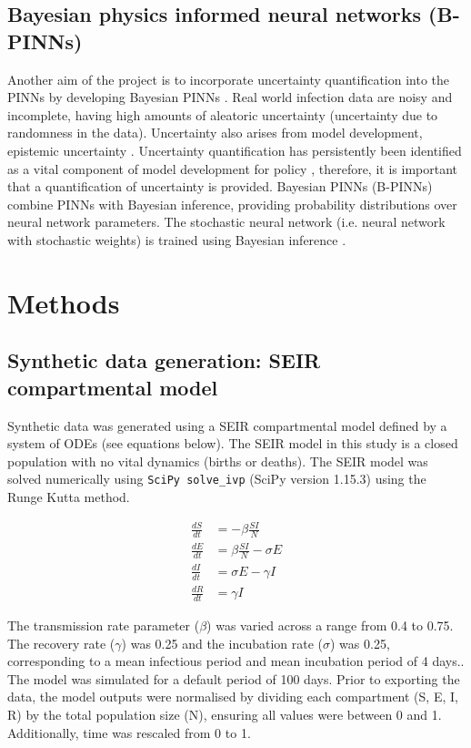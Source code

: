 \documentclass{article}
\begin{document}
\subsection{Bayesian physics informed neural networks (B-PINNs)}
Another aim of the project is to incorporate uncertainty quantification into the PINNs by developing Bayesian PINNs \parencite{https://doi.org/10.48550/arxiv.2205.08304, https://doi.org/10.48550/arxiv.2003.06097}. Real world infection data are noisy and incomplete, having high amounts of aleatoric uncertainty (uncertainty due to randomness in the data). Uncertainty also arises from model development, epistemic uncertainty \parencite{https://doi.org/10.48550/arxiv.1910.09457}. Uncertainty quantification has persistently been identified as a vital component of model development for policy \parencite{McCabe2021, Zelner2021, Juul2020}, therefore, it is important that a quantification of uncertainty is provided. Bayesian PINNs (B-PINNs) combine PINNs with Bayesian inference, providing probability distributions over neural network parameters. The stochastic neural network (i.e. neural network with stochastic weights) is trained using Bayesian inference \parencite{https://doi.org/10.48550/arxiv.2007.06823}.

\section{Methods}
\subsection{Synthetic data generation: SEIR compartmental model}
Synthetic data was generated using a SEIR compartmental model defined by a system of ODEs (see equations below). The SEIR model in this study is a closed population with no vital dynamics (births or deaths). The SEIR model was solved numerically using \texttt{SciPy solve\_ivp} (SciPy version 1.15.3) using the Runge Kutta method. 

\begin{align}
\frac{dS}{dt} &= -\beta \frac{S I}{N} \\
\frac{dE}{dt} &= \beta \frac{S I}{N} - \sigma E \\
\frac{dI}{dt} &= \sigma E - \gamma I \\
\frac{dR}{dt} &= \gamma I
\end{align}

 The transmission rate parameter ($\beta$) was varied across a range from 0.4 to 0.75. The recovery rate ($\gamma$) was 0.25 and the incubation rate ($\sigma$) was 0.25, corresponding to a mean infectious period and mean incubation period of 4 days.. The model was simulated for a default period of 100 days. Prior to exporting the data, the model outputs were normalised by dividing each compartment (S, E, I, R) by the total population size (N), ensuring all values were between 0 and 1. Additionally, time was rescaled from 0 to 1. 
\end{document}

